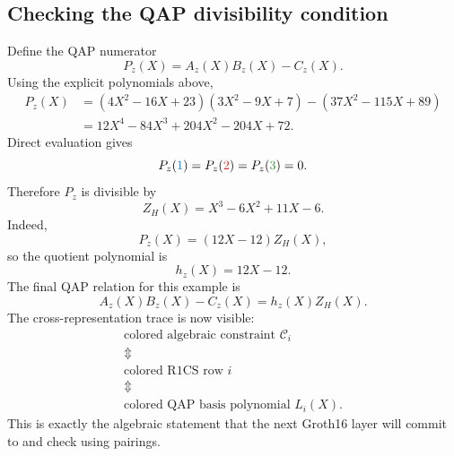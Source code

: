 \subsection{Checking the QAP divisibility condition}

Define the QAP numerator
\[
    P_z(X)=A_z(X)B_z(X)-C_z(X).
\]
Using the explicit polynomials above,
\[
\begin{aligned}
P_z(X)
&=(4X^2-16X+23)(3X^2-9X+7)-(37X^2-115X+89)\\
&=12X^4-84X^3+204X^2-204X+72.
\end{aligned}
\]
Direct evaluation gives
\[
    P_z(\rowone{1})=P_z(\rowtwo{2})=P_z(\rowthree{3})=0.
\]
Therefore $P_z$ is divisible by
\[
    Z_H(X)=X^3-6X^2+11X-6.
\]
Indeed,
\[
    P_z(X)=(12X-12)Z_H(X),
\]
so the quotient polynomial is
\[
    h_z(X)=12X-12.
\]
The final QAP relation for this example is
\[
\boxed{
    A_z(X)B_z(X)-C_z(X)=h_z(X)Z_H(X).
}
\]
The cross-representation trace is now visible:
\[
\begin{array}{c}
\text{colored algebraic constraint }\mathcal C_i\\
\Updownarrow\\
\text{colored R1CS row }i\\
\Updownarrow\\
\text{colored QAP basis polynomial }L_i(X).
\end{array}
\]
This is exactly the algebraic statement that the next Groth16 layer will commit to and check using pairings.

